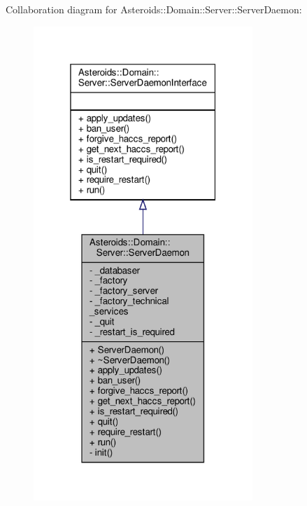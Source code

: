 Collaboration diagram for Asteroids\+:\+:Domain\+:\+:Server\+:\+:Server\+Daemon\+:\nopagebreak
\begin{figure}[H]
\begin{center}
\leavevmode
\includegraphics[width=235pt]{classAsteroids_1_1Domain_1_1Server_1_1ServerDaemon__coll__graph}
\end{center}
\end{figure}
